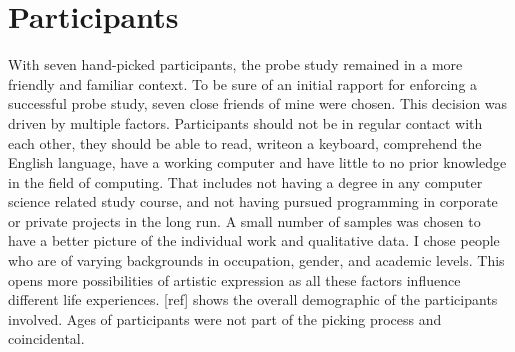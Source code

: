 \section{Participants}
With seven hand-picked participants, the probe study remained in a more friendly and familiar context. To be sure of an initial rapport for enforcing a successful probe study, seven close friends of mine were chosen. This decision was driven by multiple factors. Participants should not be in regular contact with each other, they should be able to read, writeon a keyboard, comprehend the English language, have a working computer and have little to no prior knowledge in the field of computing. That includes not having a degree in any computer science related study course, and not having pursued programming in corporate or private projects in the long run. A small number of samples was chosen to have a better picture of the individual work and qualitative data. I chose people who are of varying backgrounds in occupation, gender, and academic levels. This opens more possibilities of artistic expression as all these factors influence different life experiences. [ref] shows the overall demographic of the participants involved. Ages of participants were not part of the picking process and coincidental.